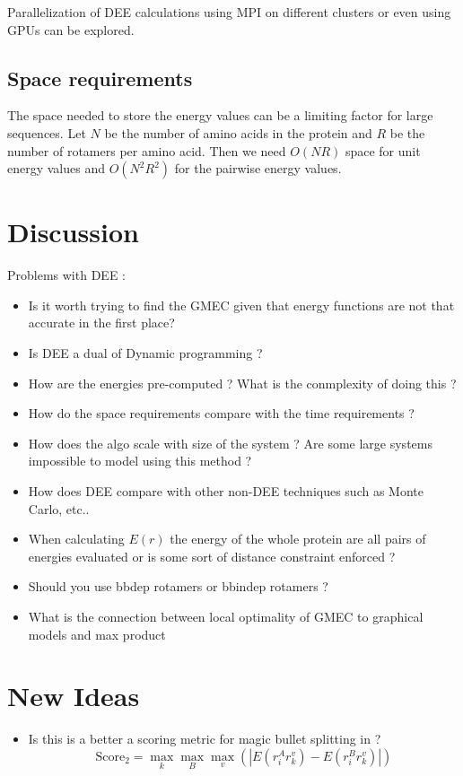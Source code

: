 \documentclass{article}
\begin{document}
Parallelization of DEE calculations using MPI on different clusters or even using GPUs can be explored. 

\subsection{Space requirements}
The space needed to store the energy values can be a limiting factor for large sequences. Let $N$ be the number of amino acids in the protein and $R$ be the number of rotamers per amino acid. Then we need $O(NR)$ space for unit energy values and $O(N^2R^2)$ for the pairwise energy values. 

\section{Discussion}

Problems with DEE :
\begin{itemize}
\item Is it worth trying to find the GMEC given that energy functions are not that accurate in the first place?
\item Is DEE a dual of Dynamic programming ? 
\item How are the energies pre-computed ? What is the conmplexity of doing this ?
\item How do the space requirements compare with the time requirements ?
\item How does the algo scale with size of the system ? Are some large systems impossible to model using this method ? 
\item How does DEE compare with other non-DEE techniques such as Monte Carlo, etc..
\item When calculating $E(r)$ the energy of the whole protein are all pairs of energies evaluated or is some sort of distance constraint enforced ?
\item Should you use bbdep rotamers or bbindep rotamers ?
\item What is the connection between local optimality of GMEC to graphical models and max product
\end{itemize}

\section{New Ideas}

\begin{itemize}
\item Is this is a better a scoring metric for magic bullet splitting in  \cite{Pierce2000} ? 
\[
\text{Score}_2 = \max_k \max_B \max_v \left( \left| E(r_i^Ar_k^v) - E(r_i^Br_k^v) \right| \right)
\]
\end{itemize}
\end{document}
